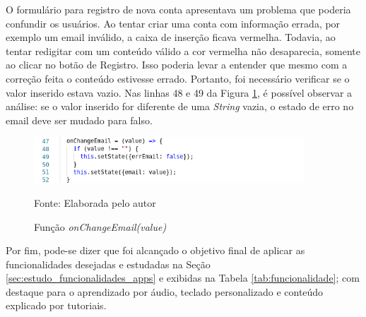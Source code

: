O formulário para registro de nova conta apresentava um problema que poderia confundir os usuários. Ao tentar criar uma conta com informação errada, por exemplo um email inválido, a caixa de inserção ficava vermelha. Todavia, ao tentar redigitar com um conteúdo válido a cor vermelha não desaparecia, somente ao clicar no botão de Registro. Isso poderia levar a entender que mesmo com a correção feita o conteúdo estivesse errado. Portanto, foi necessário verificar se o valor inserido estava vazio. Nas linhas 48 e 49 da Figura \ref{fig:onchangeemail}, é possível observar a análise: se o valor inserido for diferente de uma \textit{String} vazia, o estado de erro no email deve ser mudado para falso.

\begin{figure}[H]
\centering
    \caption{Função \textit{onChangeEmail(value)}}
    \label{fig:onchangeemail}
    \includegraphics[width=0.9\textwidth]{Figuras/onchangeemail.png}
    
    Fonte: Elaborada pelo autor
\end{figure}

Por fim, pode-se dizer que foi alcançado o objetivo final de aplicar as funcionalidades desejadas e estudadas na Seção \ref{sec:estudo_funcionalidades_apps} e exibidas na Tabela \ref{tab:funcionalidade}; com destaque para o aprendizado por áudio, teclado personalizado e conteúdo explicado por tutoriais.